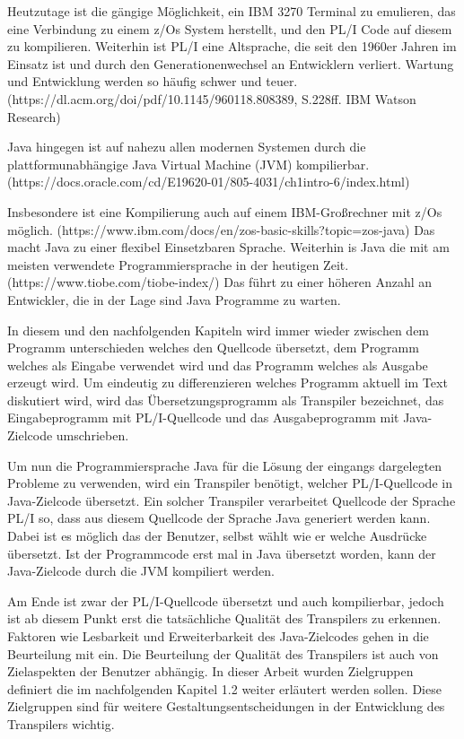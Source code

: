 Heutzutage ist die gängige Möglichkeit, ein IBM 3270 Terminal zu emulieren, das eine Verbindung zu einem z/Os System herstellt, und den PL/I Code auf diesem zu kompilieren.
Weiterhin ist PL/I eine Altsprache, die seit den 1960er Jahren im Einsatz ist und durch den Generationenwechsel an Entwicklern verliert. Wartung und Entwicklung werden so häufig schwer und teuer. (https://dl.acm.org/doi/pdf/10.1145/960118.808389, S.228ff. IBM Watson Research)

Java hingegen ist auf nahezu allen modernen Systemen durch die plattformunabhängige Java Virtual Machine (JVM) kompilierbar. 
(https://docs.oracle.com/cd/E19620-01/805-4031/ch1intro-6/index.html)

Insbesondere ist eine Kompilierung auch auf einem IBM-Großrechner mit z/Os möglich. (https://www.ibm.com/docs/en/zos-basic-skills?topic=zos-java)
Das macht Java zu einer flexibel Einsetzbaren Sprache. Weiterhin is Java die mit am meisten verwendete Programmiersprache in der heutigen Zeit. (https://www.tiobe.com/tiobe-index/) Das führt zu einer höheren Anzahl an Entwickler, die in der Lage sind Java Programme zu warten.

In diesem und den nachfolgenden Kapiteln wird immer wieder zwischen dem Programm unterschieden welches den Quellcode übersetzt, dem Programm welches als Eingabe verwendet wird und das Programm welches als Ausgabe erzeugt wird. Um eindeutig zu differenzieren welches Programm aktuell im Text diskutiert wird, wird das Übersetzungsprogramm als Transpiler bezeichnet, das Eingabeprogramm mit PL/I-Quellcode und das Ausgabeprogramm mit Java-Zielcode umschrieben. 

Um nun die Programmiersprache Java für die Lösung der eingangs dargelegten Probleme zu verwenden, wird ein Transpiler benötigt, welcher PL/I-Quellcode in Java-Zielcode übersetzt. Ein solcher Transpiler verarbeitet Quellcode der Sprache PL/I so, dass aus diesem Quellcode der Sprache Java generiert werden kann. Dabei ist es möglich das der Benutzer, selbst wählt wie er welche Ausdrücke übersetzt. Ist der Programmcode erst mal in Java übersetzt worden, kann der Java-Zielcode durch die JVM kompiliert werden.

Am Ende ist zwar der PL/I-Quellcode übersetzt und auch kompilierbar, jedoch ist ab diesem Punkt erst die tatsächliche Qualität des Transpilers zu erkennen. Faktoren wie Lesbarkeit und Erweiterbarkeit des Java-Zielcodes gehen in die Beurteilung mit ein. 
Die Beurteilung der Qualität des Transpilers ist auch von Zielaspekten der Benutzer abhängig. In dieser Arbeit wurden Zielgruppen definiert die im nachfolgenden Kapitel 1.2 weiter erläutert werden sollen. Diese Zielgruppen sind für weitere Gestaltungsentscheidungen in der Entwicklung des Transpilers wichtig.

